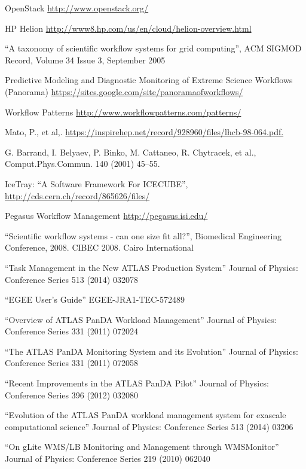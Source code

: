 \begin{thebibliography}{99}
 OpenStack \url{http://www.openstack.org/}

 HP Helion \url{http://www8.hp.com/us/en/cloud/helion-overview.html}

 ``A taxonomy of scientific workflow systems for grid computing'', ACM SIGMOD Record, Volume 34 Issue 3, September 2005

 Predictive Modeling and Diagnostic Monitoring of Extreme Science Workflows (Panorama) \url{https://sites.google.com/site/panoramaofworkflows/}

 Workflow Patterns \url{http://www.workflowpatterns.com/patterns/}

 Mato, P., et al,. \url{https://inspirehep.net/record/928960/files/lhcb-98-064.pdf.}

 G. Barrand, I. Belyaev, P. Binko, M. Cattaneo, R. Chytracek, et al., Comput.Phys.Commun. 140
(2001) 45–55.

 IceTray: ``A Software Framework For ICECUBE'', \url{http://cds.cern.ch/record/865626/files/}

 Pegasus Workflow Management \url{http://pegasus.isi.edu/}

 ``Scientific workflow systems - can one size fit all?'', Biomedical Engineering Conference, 2008. CIBEC 2008. Cairo International

 ``Task Management in the New ATLAS Production System'' Journal of Physics: Conference Series 513 (2014) 032078

 ``EGEE User’s Guide'' EGEE-JRA1-TEC-572489

 ``Overview of ATLAS PanDA Workload Management'' Journal of Physics: Conference Series 331 (2011) 072024

 ``The ATLAS PanDA Monitoring System and its Evolution'' Journal of Physics: Conference Series 331 (2011) 072058

 ``Recent Improvements in the ATLAS PanDA Pilot'' Journal of Physics: Conference Series 396 (2012) 032080

 ``Evolution of the ATLAS PanDA workload management system for exascale computational science'' Journal of Physics: Conference Series 513 (2014) 03206

 ``On gLite WMS/LB Monitoring and Management through WMSMonitor'' Journal of Physics: Conference Series 219 (2010) 062040


\end{thebibliography}
